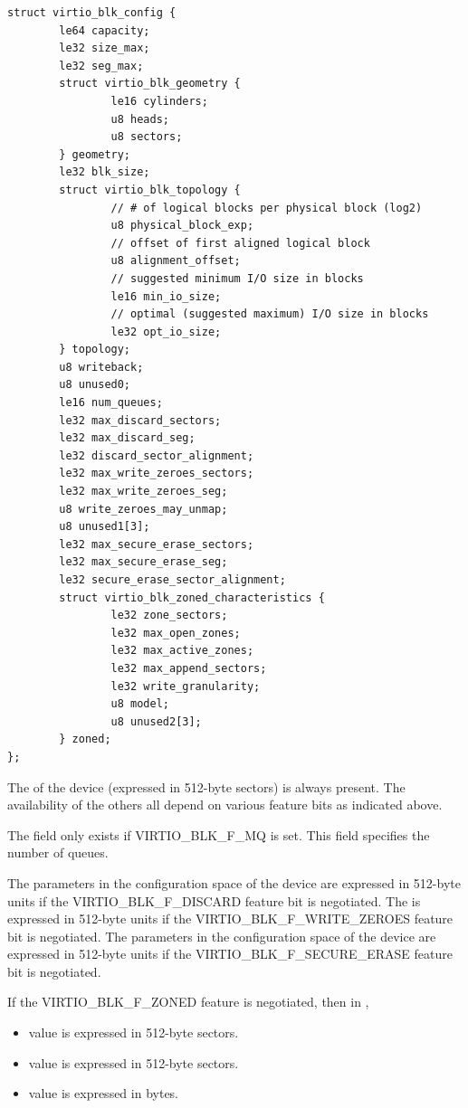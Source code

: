 \begin{lstlisting}
struct virtio_blk_config {
        le64 capacity;
        le32 size_max;
        le32 seg_max;
        struct virtio_blk_geometry {
                le16 cylinders;
                u8 heads;
                u8 sectors;
        } geometry;
        le32 blk_size;
        struct virtio_blk_topology {
                // # of logical blocks per physical block (log2)
                u8 physical_block_exp;
                // offset of first aligned logical block
                u8 alignment_offset;
                // suggested minimum I/O size in blocks
                le16 min_io_size;
                // optimal (suggested maximum) I/O size in blocks
                le32 opt_io_size;
        } topology;
        u8 writeback;
        u8 unused0;
        le16 num_queues;
        le32 max_discard_sectors;
        le32 max_discard_seg;
        le32 discard_sector_alignment;
        le32 max_write_zeroes_sectors;
        le32 max_write_zeroes_seg;
        u8 write_zeroes_may_unmap;
        u8 unused1[3];
        le32 max_secure_erase_sectors;
        le32 max_secure_erase_seg;
        le32 secure_erase_sector_alignment;
        struct virtio_blk_zoned_characteristics {
                le32 zone_sectors;
                le32 max_open_zones;
                le32 max_active_zones;
                le32 max_append_sectors;
                le32 write_granularity;
                u8 model;
                u8 unused2[3];
        } zoned;
};
\end{lstlisting}

The  of the device (expressed in 512-byte sectors) is always
present. The availability of the others all depend on various feature
bits as indicated above.

The field  only exists if VIRTIO_BLK_F_MQ is set. This field specifies
the number of queues.

The parameters in the configuration space of the device 
 are expressed in 512-byte units if the
VIRTIO_BLK_F_DISCARD feature bit is negotiated. The 
is expressed in 512-byte units if the VIRTIO_BLK_F_WRITE_ZEROES feature
bit is negotiated. The parameters in the configuration space of the device
  are expressed
in 512-byte units if the VIRTIO_BLK_F_SECURE_ERASE feature bit is negotiated.

If the VIRTIO_BLK_F_ZONED feature is negotiated, then in
,
\begin{itemize}
\item {} value is expressed in 512-byte sectors.
\item {} value is expressed in 512-byte sectors.
\item {} value is expressed in bytes.
\end{itemize}

